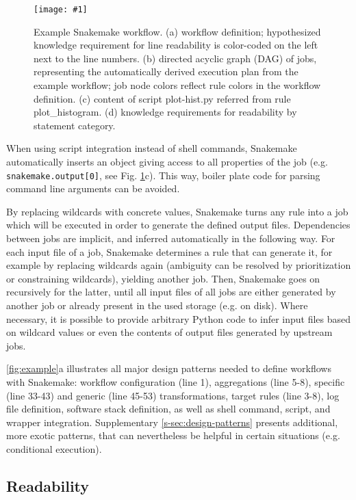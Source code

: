 \documentclass[parskip=half]{scrartcl}
\newcommand{\image}[1]{\centering\texttt{[image: \#1]}}
\begin{document}
\begin{figure}
	\image{example-workflow.pdf}
	\caption{
		Example Snakemake workflow. (a) workflow definition; hypothesized knowledge requirement for line readability is color-coded on the left next to the line numbers. (b) directed acyclic graph (DAG) of jobs, representing the automatically derived execution plan from the example workflow; job node colors reflect rule colors in the workflow definition. (c) content of script plot-hist.py referred from rule plot\_histogram. (d) knowledge requirements for readability by statement category.
	}
	\label{fig:example}
\end{figure}

When using script integration instead of shell commands, Snakemake automatically inserts an object giving access to all properties of the job (e.g. \lstinline!snakemake.output[0]!, see Fig.
\ref{fig:example}c).
This way, boiler plate code for parsing command line arguments can be avoided.

By replacing wildcards with concrete values, Snakemake turns any rule into a job which will be executed in order to generate the defined output files.
Dependencies between jobs are implicit, and inferred automatically in the following way.
For each input file of a job, Snakemake determines a rule that can generate it, for example by replacing wildcards again (ambiguity can be resolved by prioritization or constraining wildcards), yielding another job.
Then, Snakemake goes on recursively for the latter, until all input files of all jobs are either generated by another job or already present in the used storage (e.g. on disk).
Where necessary, it is possible to provide arbitrary Python code to infer input files based on wildcard values or even the contents of output files generated by upstream jobs.

\autoref{fig:example}a illustrates all major design patterns needed to define workflows with Snakemake: workflow configuration (line 1), aggregations (line 5-8), specific (line 33-43) and generic (line 45-53) transformations, target rules (line 3-8), log file definition, software stack definition, as well as shell command, script, and wrapper integration.
Supplementary \autoref{s-sec:design-patterns} presents additional, more exotic patterns, that can nevertheless be helpful in certain situations (e.g. conditional execution).

\subsection{Readability}
\end{document}

